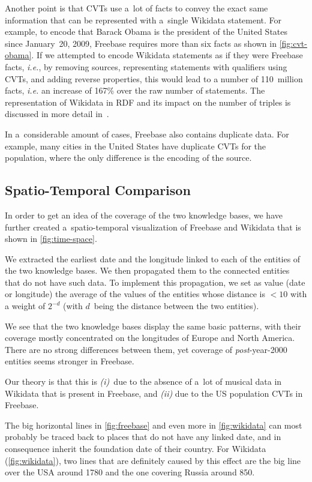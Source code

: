 \documentclass{acm_proc_article-sp}
\begin{document}
Another point is that CVTs use a~lot of facts to convey the exact same information
that can be represented with a~single Wikidata statement.
For example, to encode that Barack Obama is the president
of the United States since January~20, 2009,
Freebase requires more than six facts as shown in \autoref{fig:cvt-obama}.
If we attempted to encode Wikidata statements as if they were Freebase facts, \emph{i.e.},
by removing sources, representing statements with qualifiers using CVTs,
and adding reverse properties, this would lead to a number of 110~million facts,
\emph{i.e.} an increase of 167\% over the raw number of statements.
The representation of Wikidata in RDF and its impact on the number of triples
is discussed in more detail in~\cite{reification-wikidata}.

In a~considerable amount of cases, Freebase also contains duplicate data.
For example, many cities in the United States have duplicate CVTs for the population,
where the only difference is the encoding of the source.

\subsection{Spatio-Temporal Comparison}

In order to get an idea of the coverage of the two knowledge bases,
we have further created a~spatio-temporal visualization of Freebase and Wikidata 
that is shown in \autoref{fig:time-space}.

We extracted the earliest date and the longitude
linked to each of the entities of the two knowledge bases.
We then propagated them to the connected entities that do not have such data.
To implement this propagation, we set as value (date or longitude)
the average of the values of the entities whose distance is $<10$
with a weight of $2^{-d}$ (with $d$~being the distance between the two entities).

We see that the two knowledge bases display the same basic patterns,
with their coverage mostly concentrated on the longitudes of Europe and North America.
There are no strong differences between them,
yet coverage of \mbox{\emph{post}-year-2000} entities seems stronger in Freebase.

Our theory is that this is
\emph{(i)}~due to the absence of a~lot of musical data in Wikidata that is present in Freebase,
and \emph{(ii)} due to the US population CVTs in Freebase.

The big horizontal lines in \autoref{fig:freebase} and even more in \autoref{fig:wikidata}
can most probably be traced back to places that do not have any linked date,
and in consequence inherit the foundation date of their country.
For Wikidata (\autoref{fig:wikidata}), two lines that are definitely caused by this effect
are the big line over the USA around 1780
and the one covering Russia around 850.
\end{document}
